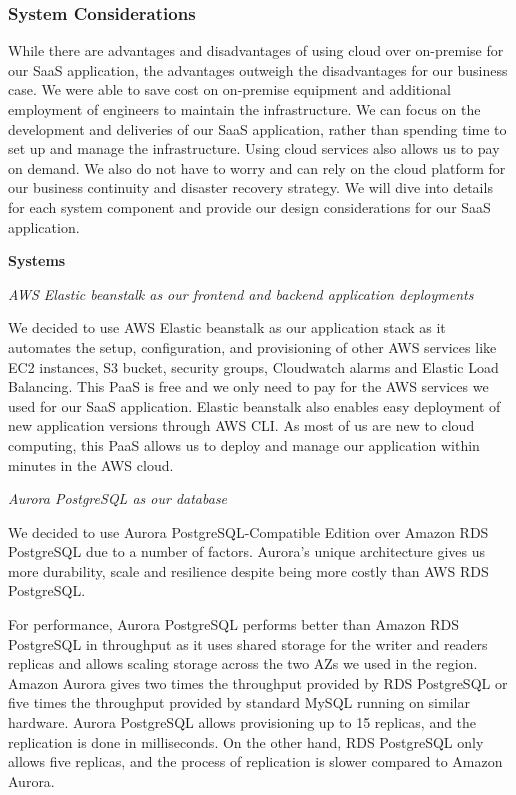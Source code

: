 \documentclass[12pt,a4paper]{article}
\begin{document}
        \subsubsection{System Considerations}
        
        While there are advantages and disadvantages of using cloud over on-premise for our SaaS application, the advantages outweigh the disadvantages for our business case. We were able to save cost on on-premise equipment and additional employment of engineers to maintain the infrastructure. We can focus on the development and deliveries of our SaaS application, rather than spending time to set up and manage the infrastructure. Using cloud services also allows us to pay on demand. We also do not have to worry and can rely on the cloud platform for our business continuity and disaster recovery strategy. We will dive into details for each system component and provide our design considerations for our SaaS application.
        
            \textbf{Systems}
            
            \textit{AWS Elastic beanstalk as our frontend and backend application deployments}
            
            We decided to use AWS Elastic beanstalk as our application stack as it automates the setup, configuration, and provisioning of other AWS services like EC2 instances, S3 bucket, security groups, Cloudwatch alarms and Elastic Load Balancing. This PaaS is free and we only need to pay for the AWS services we used for our SaaS application. Elastic beanstalk also enables easy deployment of new application versions through AWS CLI. As most of us are new to cloud computing, this PaaS allows us to deploy and manage our application within minutes in the AWS cloud.
            
            \textit{Aurora PostgreSQL as our database}
            
            We decided to use Aurora PostgreSQL-Compatible Edition over Amazon RDS PostgreSQL due to a number of factors. Aurora's unique architecture gives us more durability, scale and resilience despite being more costly than AWS RDS PostgreSQL.

            For performance, Aurora PostgreSQL performs better than Amazon RDS PostgreSQL in throughput as it uses shared storage for the writer and readers replicas and allows scaling storage across the two AZs we used in the region. Amazon Aurora gives two times the throughput provided by RDS PostgreSQL or five times the throughput provided by standard MySQL running on similar hardware. Aurora PostgreSQL allows provisioning up to 15 replicas, and the replication is done in milliseconds. On the other hand, RDS PostgreSQL only allows five replicas, and the process of replication is slower compared to Amazon Aurora.
            
\end{document}
